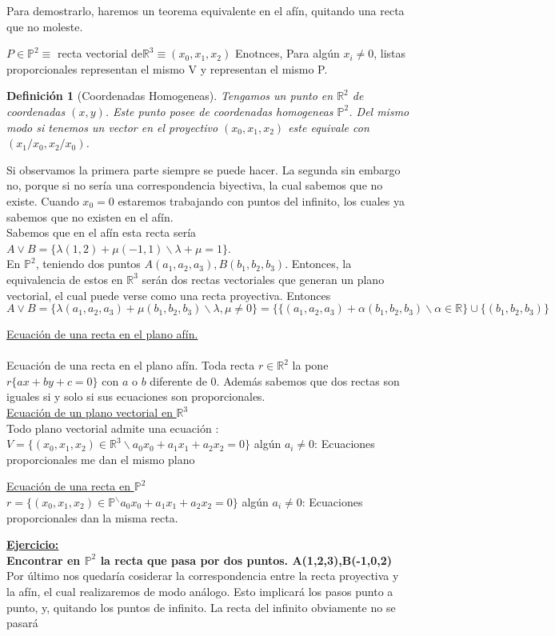 \documentclass[11pt, a4paper]{article}
\makeatletter
\newif\IfInSansMode
\let\oldsf\sffamily
\renewcommand*{\sffamily}{\oldsf\mathversion{sans}\InSansModetrue}
\let\oldnorm\normalfont
\renewcommand*{\normalfont}{\oldnorm\InSansModefalse\mathversion{normal}}
\renewenvironment{proof}[1][\proofname] {\vspace{-15pt}\par\pushQED{\qed}\normalfont\topsep6\p@\@plus6\p@\relax\trivlist\item[\hskip\labelsep\it#1\@addpunct{.}]\ignorespaces}{\popQED\endtrivlist\@endpefalse}
\renewenvironment{proof}[1][\proofname] {\par\pushQED{\qed}\normalfont\topsep6\p@\@plus6\p@\relax\trivlist\item[\hskip\labelsep\itshape\sffamily#1\@addpunct{.}]\ignorespaces}{\popQED\endtrivlist\@endpefalse}
\theoremstyle{theorem-style}
\theoremstyle{definition-style}
\newtheorem{ndef}{Definición}[section]
\theoremstyle{remark-style}
\theoremstyle{example-style}
\makeatother
\begin{document}
\begin{proof}
	Para demostrarlo, haremos un teorema equivalente en el afín, quitando una recta que no moleste.
\end{proof}

	$P \in \mathbb{P}^2 \equiv$ recta vectorial de$ \mathbb{R}^3 \equiv (x_0,x_1,x_2) $
	Enotnces, Para algún $x_i \ne 0$, listas proporcionales representan el mismo V y representan el mismo P.

\begin{ndef}[Coordenadas Homogeneas]
	Tengamos un punto en $\mathbb{R}^2$ de coordenadas $(x,y)$. Este punto posee de coordenadas homogeneas $\mathbb{P}^2$. Del mismo modo si tenemos un vector en el proyectivo  $(x_0, x_1, x_2)$ este equivale con $(x_1/x_0, x_2/x_0)$. 
\end{ndef}

Si observamos la primera parte siempre se puede hacer. La segunda sin embargo no, porque si no sería una correspondencia biyectiva, la cual sabemos que no existe. Cuando $x_0 = 0$ estaremos trabajando con puntos del infinito, los cuales ya sabemos que no existen en el afín.\\


Sabemos que en el afín esta recta sería $A \vee B = \{ \lambda (1,2) + \mu (-1,1) \backslash \lambda + \mu = 1\}$.\\
En $\mathbb{P}^2$, teniendo dos puntos $A(a_1,a_2,a_3), B(b_1,b_2,b_3)$. Entonces, la equivalencia de estos en  $\mathbb{R}^3$ serán dos rectas vectoriales que generan un plano vectorial, el cual puede verse como una recta proyectiva. Entonces $A\vee B = \{ \lambda (a_1,a_2,a_3) + \mu (b_1,b_2,b_3)\backslash \lambda, \mu \ne 0 \} = \{  \{ (a_1,a_2,a_3) + \alpha (b_1,b_2,b_3)\backslash \alpha  \in \mathbb{R}\} \cup  \{(b_1,b_2,b_3) \}$

\underline{Ecuación de una recta en el plano afín.\\}\\
Ecuación de una recta en el plano afín. Toda recta $r \in \mathbb{R}^2$ la pone $r\{ax+by+c= 0\}$ con $a$ o $b$ diferente de 0. Además sabemos que dos rectas son iguales si y solo si sus ecuaciones son proporcionales. \\
\underline{Ecuación de un plano vectorial en $\mathbb{R}^3$}\\
Todo plano vectorial admite una ecuación : $V = \{(x_0,x_1,x_2) \in \mathbb{R}^3 \backslash a_0x_0+a_1x_1+a_2x_2 = 0\}$ algún $a_i \ne 0$: Ecuaciones proporcionales me dan el mismo plano

\underline{Ecuación de una recta en $\mathbb{P}^2$}\\
$r = \{(x_0,x_1,x_2) \in \mathbb{P}^ \backslash a_0x_0+a_1x_1+a_2x_2 = 0\}$ algún $a_i \ne 0$: Ecuaciones proporcionales dan la misma recta.

\textbf{\underline{
Ejercicio:\\}
Encontrar en $\mathbb{P}^2$ la recta que pasa por dos puntos. A(1,2,3),B(-1,0,2)}\\

Por  último nos quedaría cosiderar la correspondencia entre la recta proyectiva y la afín, el cual realizaremos de modo análogo. Esto implicará los pasos punto a punto, y, quitando los puntos de infinito. La recta del infinito obviamente no se pasará
\end{document}
